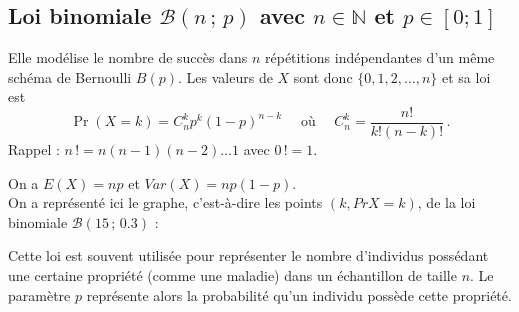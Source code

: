 \documentclass[12pt, a4paper]{book}
\numberwithin{equation}{section}
\begin{document}
\subsection[Loi binomiale]{Loi binomiale $\mathcal{B}(n\,;\,p)$ avec $n\in\mathbb{N}$ et $p\in[0;1]$}
Elle modélise le nombre de succès  dans $n$  répétitions  indépendantes d'un même
schéma de Bernoulli $B(p)$. Les valeurs de $X$ sont donc $\{0,1,2,\hdots,n\}$ et sa loi est
$$
\Pr(X=k)=C_n^k p^k (1-p)^{n-k}\quad {\mbox { où }}\quad C_n^k=\frac{n!}{k!(n-k)!}\,.
$$
\noindent Rappel : $n\,!=n(n-1)(n-2)\hdots 1$ avec $0\, !=1$.

\noindent On a $E(X)=np$ et $Var(X)=np(1-p)$.\\

On a représenté ici le graphe, c'est-à-dire les points $(k,PrX=k)$, de la loi binomiale $\mathcal{B}(15\,;\,0.3)$ :

\begin{center}
\end{center}



Cette loi est souvent utilisée pour représenter le nombre d'individus possédant une certaine propriété  
(comme une maladie) dans un échantillon de taille $n$. Le paramètre $p$ représente alors la probabilité qu'un individu
possède cette propriété.
\end{document}
